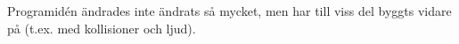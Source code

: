 Programidén ändrades inte ändrats så mycket,
men har till viss del byggts vidare på (t.ex. med kollisioner och ljud).

